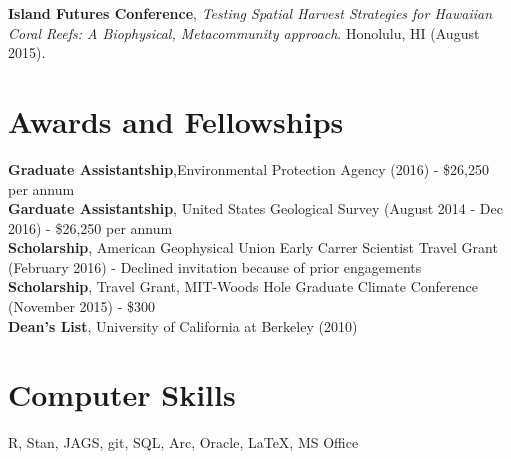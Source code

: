 \documentclass[10pt, letterpaper]{article}
\begin{document}
\noindent \textbf{Island Futures Conference}, \textit{Testing Spatial Harvest Strategies for Hawaiian Coral Reefs: A Biophysical, Metacommunity approach}. Honolulu, HI (August 2015).

\section*{Awards and Fellowships}
\textbf{Graduate Assistantship},Environmental Protection Agency (2016) - \$26,250 per annum \\
\textbf{Garduate Assistantship}, United States Geological Survey (August 2014 - Dec 2016) - \$26,250 per annum \\
\textbf{Scholarship}, American Geophysical Union Early Carrer Scientist Travel Grant (February 2016) - Declined invitation because of prior engagements \\
\textbf{Scholarship}, Travel Grant, MIT-Woods Hole Graduate Climate Conference (November 2015) - \$300 \\
\textbf{Dean's List}, University of California at Berkeley (2010) \\

\section*{Computer Skills}
 R, Stan, JAGS, git, SQL, Arc, Oracle, \LaTeX, MS Office
\end{document}
